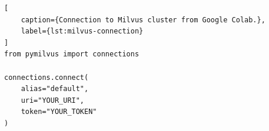 \begin{lstlisting}[
    caption={Connection to Milvus cluster from Google Colab.},
    label={lst:milvus-connection}
]
from pymilvus import connections

connections.connect(
    alias="default",
    uri="YOUR_URI",
    token="YOUR_TOKEN"
)
\end{lstlisting}